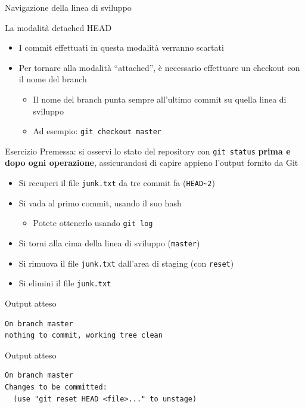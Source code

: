 \documentclass[xcolor=dvipsnames,presentation]{beamer}
\begin{document}
\begin{frame}{Navigazione della linea di sviluppo}
\begin{block}{La modalità detached HEAD}
        \begin{itemize}
            \item I commit effettuati in questa modalità verranno scartati
            \item Per tornare alla modalità ``attached'', è necessario effettuare un checkout con il nome del branch
            \begin{itemize}
                \item Il nome del branch punta sempre all'ultimo commit su quella linea di sviluppo
                \item Ad esempio: \texttt{git checkout master}
            \end{itemize}
        \end{itemize}
    \end{block}
    \begin{block}{Esercizio}
        Premessa: si osservi lo stato del repository con \texttt{git status} \textbf{prima e dopo ogni operazione}, assicurandosi di capire appieno l'output fornito da Git
        \begin{itemize}
            \item Si recuperi il file \texttt{junk.txt} da tre commit fa (\texttt{HEAD\textasciitilde{}2})
            \item Si vada al primo commit, usando il suo hash
            \begin{itemize}
                \item Potete ottenerlo usando \texttt{git log}
            \end{itemize}
            \item Si torni alla cima della linea di sviluppo (\texttt{master})
            \item Si rimuova il file \texttt{junk.txt} dall'area di staging (con \texttt{reset})
            \item Si elimini il file \texttt{junk.txt}
        \end{itemize}
    \end{block}
    \begin{block}{Output atteso}
        \begin{Verbatim}[fontsize=\scriptsize]
On branch master
nothing to commit, working tree clean
        \end{Verbatim}
    \end{block}
    \begin{block}{Output atteso}
        \begin{Verbatim}[fontsize=\scriptsize]
On branch master
Changes to be committed:
  (use "git reset HEAD <file>..." to unstage)


\end{Verbatim}
\end{block}
\end{frame}
\end{document}
